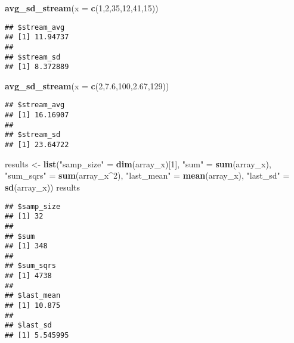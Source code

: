 \documentclass[]{article}
\newenvironment{Shaded}{\begin{snugshade}}{\end{snugshade}}
\newcommand{\KeywordTok}[1]{\textcolor[rgb]{0.13,0.29,0.53}{\textbf{{#1}}}}
\newcommand{\DataTypeTok}[1]{\textcolor[rgb]{0.13,0.29,0.53}{{#1}}}
\newcommand{\DecValTok}[1]{\textcolor[rgb]{0.00,0.00,0.81}{{#1}}}
\newcommand{\FloatTok}[1]{\textcolor[rgb]{0.00,0.00,0.81}{{#1}}}
\newcommand{\StringTok}[1]{\textcolor[rgb]{0.31,0.60,0.02}{{#1}}}
\newcommand{\NormalTok}[1]{{#1}}
\begin{document}
\begin{Shaded}
\begin{Highlighting}[]
\KeywordTok{avg_sd_stream}\NormalTok{(}\DataTypeTok{x =} \KeywordTok{c}\NormalTok{(}\DecValTok{1}\NormalTok{,}\DecValTok{2}\NormalTok{,}\DecValTok{35}\NormalTok{,}\DecValTok{12}\NormalTok{,}\DecValTok{41}\NormalTok{,}\DecValTok{15}\NormalTok{))}
\end{Highlighting}
\end{Shaded}

\begin{verbatim}
## $stream_avg
## [1] 11.94737
## 
## $stream_sd
## [1] 8.372889
\end{verbatim}

\begin{Shaded}
\begin{Highlighting}[]
\KeywordTok{avg_sd_stream}\NormalTok{(}\DataTypeTok{x =} \KeywordTok{c}\NormalTok{(}\DecValTok{2}\NormalTok{,}\FloatTok{7.6}\NormalTok{,}\DecValTok{100}\NormalTok{,}\FloatTok{2.67}\NormalTok{,}\DecValTok{129}\NormalTok{))}
\end{Highlighting}
\end{Shaded}

\begin{verbatim}
## $stream_avg
## [1] 16.16907
## 
## $stream_sd
## [1] 23.64722
\end{verbatim}

\begin{Shaded}
\begin{Highlighting}[]
\NormalTok{results <-}\StringTok{ }\KeywordTok{list}\NormalTok{(}\StringTok{"samp_size"} \NormalTok{=}\StringTok{ }\KeywordTok{dim}\NormalTok{(array_x)[}\DecValTok{1}\NormalTok{], }
                \StringTok{"sum"} \NormalTok{=}\StringTok{ }\KeywordTok{sum}\NormalTok{(array_x), }
                \StringTok{"sum_sqrs"} \NormalTok{=}\StringTok{ }\KeywordTok{sum}\NormalTok{(array_x^}\DecValTok{2}\NormalTok{), }
                \StringTok{"last_mean"} \NormalTok{=}\StringTok{ }\KeywordTok{mean}\NormalTok{(array_x),}
                \StringTok{"last_sd"} \NormalTok{=}\StringTok{ }\KeywordTok{sd}\NormalTok{(array_x))}
\NormalTok{results}
\end{Highlighting}
\end{Shaded}

\begin{verbatim}
## $samp_size
## [1] 32
## 
## $sum
## [1] 348
## 
## $sum_sqrs
## [1] 4738
## 
## $last_mean
## [1] 10.875
## 
## $last_sd
## [1] 5.545995
\end{verbatim}
\end{document}
